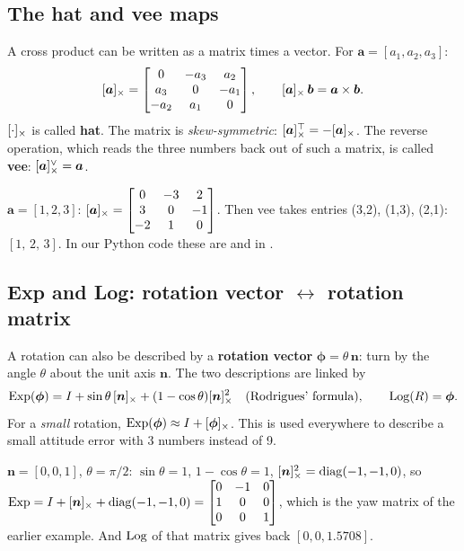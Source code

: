 \subsection{The hat and vee maps}

A cross product can be written as a matrix times a vector. For $\bm a=[a_1,a_2,a_3]$:
\[
[\bm a]_{\times}=\begin{bmatrix}0&-a_3&a_2\\a_3&0&-a_1\\-a_2&a_1&0\end{bmatrix},\qquad [\bm a]_{\times}\,\bm b=\bm a\times\bm b .
\]
$[\cdot]_{\times}$ is called \textbf{hat}. The matrix is \emph{skew-symmetric}: $[\bm a]_{\times}^\top=-[\bm a]_{\times}$. The reverse
operation, which reads the three numbers back out of such a matrix, is called \textbf{vee}: $[\bm a]_{\times}^\vee=\bm a$.
\begin{toy}
$\bm a=[1,2,3]$: $[\bm a]_{\times}=\begin{bmatrix}0&-3&2\\3&0&-1\\-2&1&0\end{bmatrix}$. Then vee takes entries (3,2), (1,3), (2,1):
$[1,\,2,\,3]$. In our Python code these are  and  in .
\end{toy}

\subsection{Exp and Log: rotation vector $\leftrightarrow$ rotation matrix}

A rotation can also be described by a \textbf{rotation vector} $\bm\phi=\theta\,\bm n$: turn by the angle $\theta$
about the unit axis $\bm n$. The two descriptions are linked by
\[
\mathrm{Exp}(\bm\phi)=I+\sin\theta\,[\bm n]_{\times}+(1-\cos\theta)[\bm n]_{\times}^2\quad\text{(Rodrigues' formula)},\qquad \mathrm{Log}(R)=\bm\phi .
\]
For a \emph{small} rotation, $\mathrm{Exp}(\bm\phi)\approx I+[\bm\phi]_{\times}$. This is used everywhere to describe a small
attitude error with 3 numbers instead of 9.
\begin{toy}
$\bm n=[0,0,1]$, $\theta=\pi/2$: $\sin\theta=1$, $1-\cos\theta=1$, $[\bm n]_{\times}^2=\operatorname{diag}(-1,-1,0)$, so
$\mathrm{Exp}=I+[\bm n]_{\times}+\operatorname{diag}(-1,-1,0)=\begin{bmatrix}0&-1&0\\1&0&0\\0&0&1\end{bmatrix}$, which is the yaw matrix of the earlier example.
And $\mathrm{Log}$ of that matrix gives back $[0,0,1.5708]$.
\end{toy}

